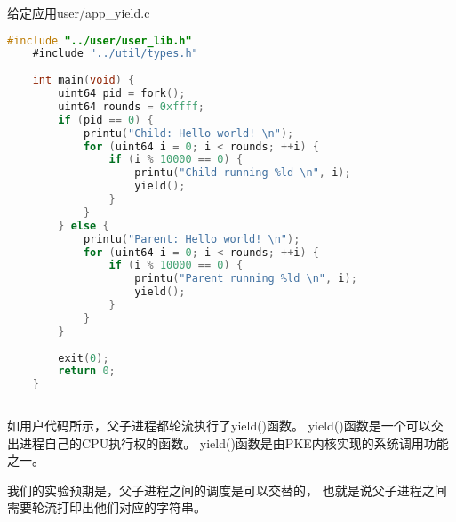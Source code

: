 给定应用user/app\_yield.c

\begin{lstlisting}[caption={用户态应用app\_yield.c}, label={lst:app_yield}, language=C]
    #include "../user/user_lib.h"
    #include "../util/types.h"
    
    int main(void) {
        uint64 pid = fork();
        uint64 rounds = 0xffff;
        if (pid == 0) {
            printu("Child: Hello world! \n");
            for (uint64 i = 0; i < rounds; ++i) {
                if (i % 10000 == 0) {
                    printu("Child running %ld \n", i);
                    yield();
                }
            }
        } else {
            printu("Parent: Hello world! \n");
            for (uint64 i = 0; i < rounds; ++i) {
                if (i % 10000 == 0) {
                    printu("Parent running %ld \n", i);
                    yield();
                }
            }
        }
    
        exit(0);
        return 0;
    }
    
\end{lstlisting}

如用户代码所示，父子进程都轮流执行了yield()函数。
yield()函数是一个可以交出进程自己的CPU执行权的函数。
yield()函数是由PKE内核实现的系统调用功能之一。

我们的实验预期是，父子进程之间的调度是可以交替的，
也就是说父子进程之间需要轮流打印出他们对应的字符串。

